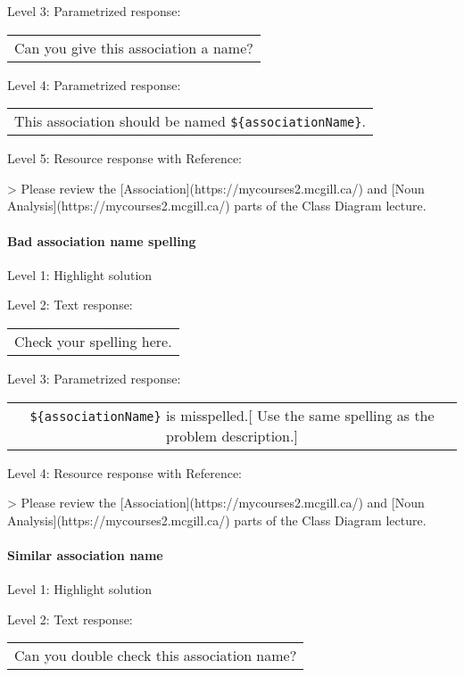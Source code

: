 \noindent Level 3: Parametrized response: \medskip

\begin{tabular}{|c}
Can you give this association a name?
\end{tabular} \medskip

\noindent Level 4: Parametrized response: \medskip

\begin{tabular}{|c}
This association should be named \verb|${associationName}|.
\end{tabular} \medskip

\noindent Level 5: Resource response with Reference:

> Please review the [Association](https://mycourses2.mcgill.ca/) and [Noun Analysis](https://mycourses2.mcgill.ca/) parts of the Class Diagram lecture.


\paragraph{Bad association name spelling}

\noindent Level 1: Highlight solution \medskip

\noindent Level 2: Text response: \medskip

\begin{tabular}{|c}
Check your spelling here.
\end{tabular} \medskip

\noindent Level 3: Parametrized response: \medskip

\begin{tabular}{|c}
\verb|${associationName}| is misspelled.[ Use the same spelling as the problem description.]
\end{tabular} \medskip

\noindent Level 4: Resource response with Reference:

> Please review the [Association](https://mycourses2.mcgill.ca/) and [Noun Analysis](https://mycourses2.mcgill.ca/) parts of the Class Diagram lecture.


\paragraph{Similar association name}

\noindent Level 1: Highlight solution \medskip

\noindent Level 2: Text response: \medskip

\begin{tabular}{|c}
Can you double check this association name?
\end{tabular} \medskip

